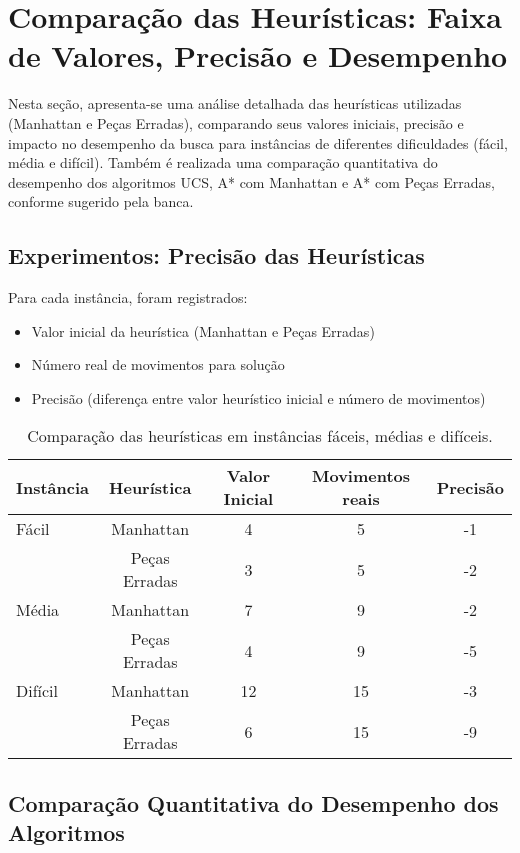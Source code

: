 \section{Comparação das Heurísticas: Faixa de Valores, Precisão e Desempenho}  
  
Nesta seção, apresenta-se uma análise detalhada das heurísticas utilizadas (Manhattan e Peças Erradas), comparando seus valores iniciais, precisão e impacto no desempenho da busca para instâncias de diferentes dificuldades (fácil, média e difícil). Também é realizada uma comparação quantitativa do desempenho dos algoritmos UCS, A* com Manhattan e A* com Peças Erradas, conforme sugerido pela banca.  
  
\subsection{Experimentos: Precisão das Heurísticas}  
  
Para cada instância, foram registrados:  
\begin{itemize}  
    \item Valor inicial da heurística (Manhattan e Peças Erradas)  
    \item Número real de movimentos para solução  
    \item Precisão (diferença entre valor heurístico inicial e número de movimentos)  
\end{itemize}  
  
\begin{table}[H]  
\centering  
\caption{Comparação das heurísticas em instâncias fáceis, médias e difíceis.}  
\begin{tabular}{lcccc}  
\toprule  
Instância & Heurística & Valor Inicial & Movimentos reais & Precisão \\  
\midrule  
Fácil    & Manhattan     & 4 & 5 & -1 \\  
         & Peças Erradas & 3 & 5 & -2 \\  
Média    & Manhattan     & 7 & 9 & -2 \\  
         & Peças Erradas & 4 & 9 & -5 \\  
Difícil  & Manhattan     & 12 & 15 & -3 \\  
         & Peças Erradas & 6 & 15 & -9 \\  
\bottomrule  
\end{tabular}  
\end{table}  
  
\subsection{Comparação Quantitativa do Desempenho dos Algoritmos}  
  
